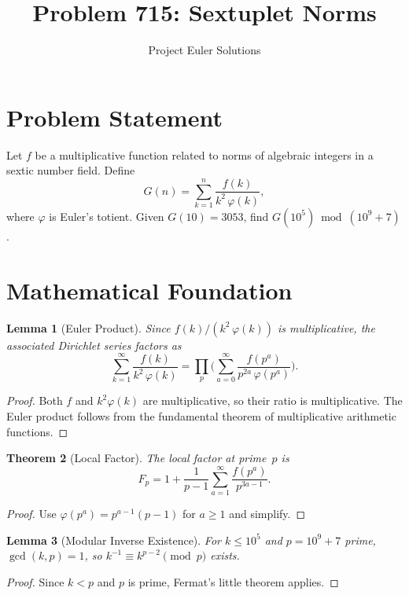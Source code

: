 \documentclass[11pt]{article}
\title{Problem 715: Sextuplet Norms}
\author{Project Euler Solutions}
\date{}
\newtheorem{theorem}{Theorem}
\newtheorem{lemma}[theorem]{Lemma}
\begin{document}
\maketitle

\section{Problem Statement}

Let $f$ be a multiplicative function related to norms of algebraic integers in a sextic number field. Define
\[
G(n) = \sum_{k=1}^{n} \frac{f(k)}{k^2 \,\varphi(k)},
\]
where $\varphi$ is Euler's totient. Given $G(10) = 3053$, find $G(10^5) \bmod (10^9+7)$.

\section{Mathematical Foundation}

\begin{lemma}[Euler Product]
Since $f(k)/(k^2\,\varphi(k))$ is multiplicative, the associated Dirichlet series factors as
\[
\sum_{k=1}^{\infty} \frac{f(k)}{k^2\,\varphi(k)} = \prod_{p} \Biggl(\sum_{a=0}^{\infty} \frac{f(p^a)}{p^{2a}\,\varphi(p^a)}\Biggr).
\]
\end{lemma}

\begin{proof}
Both $f$ and $k^2\varphi(k)$ are multiplicative, so their ratio is multiplicative. The Euler product follows from the fundamental theorem of multiplicative arithmetic functions.
\end{proof}

\begin{theorem}[Local Factor]
The local factor at prime~$p$ is
\[
F_p = 1 + \frac{1}{p-1}\sum_{a=1}^{\infty} \frac{f(p^a)}{p^{3a-1}}.
\]
\end{theorem}

\begin{proof}
Use $\varphi(p^a) = p^{a-1}(p-1)$ for $a \ge 1$ and simplify.
\end{proof}

\begin{lemma}[Modular Inverse Existence]
For $k \le 10^5$ and $p = 10^9+7$ prime, $\gcd(k,p)=1$, so $k^{-1} \equiv k^{p-2} \pmod{p}$ exists.
\end{lemma}

\begin{proof}
Since $k < p$ and $p$ is prime, Fermat's little theorem applies.
\end{proof}
\end{document}
